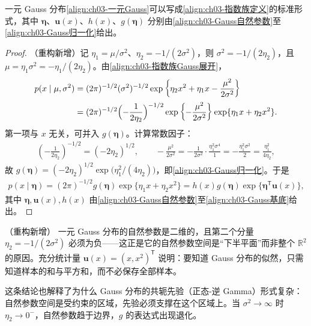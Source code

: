 \documentclass[../../main.tex]{subfiles}
\begin{document}
\begin{proposition}\label{proposition:ch03-Gauss指数族}
一元 Gauss 分布\eqref{align:ch03-一元Gauss}可以写成\eqref{align:ch03-指数族定义}的标准形式，其中 $\boldsymbol{\eta}$、$\boldsymbol{u}(x)$、$h(x)$、$g(\boldsymbol{\eta})$ 分别由\eqref{align:ch03-Gauss自然参数}至\eqref{align:ch03-Gauss归一化}给出。
\end{proposition}
\begin{proof}
（重构新增）记 $\eta_1=\mu/\sigma^{2}$、$\eta_2=-1/(2\sigma^{2})$，则 $\sigma^{2}=-1/(2\eta_2)$，且 $\mu=\eta_1\sigma^{2}=-\eta_1/(2\eta_2)$。由\eqref{align:ch03-指数族Gauss展开}，
\begin{align*}
p(x\mid\mu,\sigma^{2})&=(2\pi)^{-1/2}(\sigma^{2})^{-1/2}\exp\left\{\eta_2x^{2}+\eta_1x-\frac{\mu^{2}}{2\sigma^{2}}\right\}\\
&=(2\pi)^{-1/2}\Bigl(-\frac{1}{2\eta_2}\Bigr)^{-1/2}\exp\left\{-\frac{\mu^{2}}{2\sigma^{2}}\right\}\exp\{\eta_1x+\eta_2x^{2}\}.
\end{align*}
第一项与 $x$ 无关，可并入 $g(\boldsymbol{\eta})$。计算常数因子：
\begin{align*}
(-\tfrac{1}{2\eta_2})^{-1/2}=(-2\eta_2)^{1/2},\qquad -\frac{\mu^{2}}{2\sigma^{2}}=-\frac{1}{2\sigma^{2}}\cdot\frac{\eta_1^{2}\sigma^{4}}{1}=-\frac{\eta_1^{2}\sigma^{2}}{2}=\frac{\eta_1^{2}}{4\eta_2},
\end{align*}
故 $g(\boldsymbol{\eta})=(-2\eta_2)^{1/2}\exp\bigl(\eta_1^{2}/(4\eta_2)\bigr)$，即\eqref{align:ch03-Gauss归一化}。于是
\begin{align*}
p(x\mid\boldsymbol{\eta})=(2\pi)^{-1/2}g(\boldsymbol{\eta})\exp\{\eta_1x+\eta_2x^{2}\}=h(x)g(\boldsymbol{\eta})\exp\{\boldsymbol{\eta}^{\mathsf{T}}\boldsymbol{u}(x)\},
\end{align*}
其中 $\boldsymbol{\eta},\boldsymbol{u}(x),h(x)$ 由\eqref{align:ch03-Gauss自然参数}至\eqref{align:ch03-Gauss基底}给出。
\end{proof}

\begin{remark}（重构新增）
一元 Gauss 分布的自然参数是二维的，且第二个分量 $\eta_2=-1/(2\sigma^{2})$ 必须为负——这正是它的自然参数空间是“下半平面”而非整个 $\mathbb{R}^{2}$ 的原因。充分统计量 $\boldsymbol{u}(x)=(x,x^{2})^{\mathsf{T}}$ 说明：要知道 Gauss 分布的似然，只需知道样本的和与平方和，而不必保存全部样本。

这条结论也解释了为什么 Gauss 分布的共轭先验（正态-逆 Gamma）形式复杂：自然参数空间是受约束的区域，先验必须支撑在这个区域上。当 $\sigma^{2}\to\infty$ 时 $\eta_2\to0^{-}$，自然参数趋于边界，$g$ 的表达式出现退化。
\end{remark}
\end{document}
